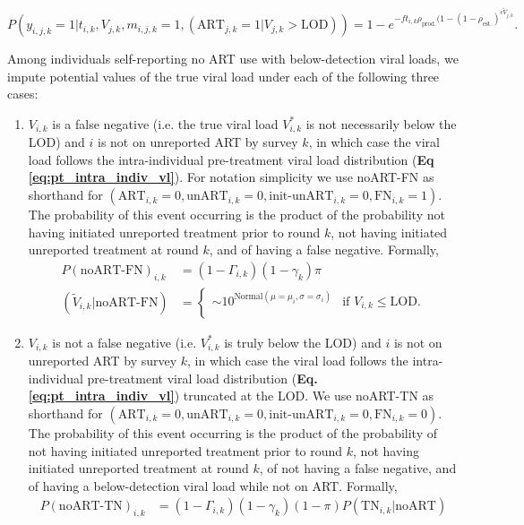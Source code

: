 \documentclass{article}[11pt]
\begin{document}
\begin{equation}
    P\left(y_{i,j,k}=1|t_{i,k},V_{j,k},m_{i,j,k}=1, (\text{ART}_{j,k}=1 |V_{j,k}>\text{LOD})\right) = 1 - e^{-ft_{i,k}\rho_\text{prod.}(1-(1-\rho_\text{est.})^{c\tilde{V}_{j,k}}}.
\end{equation}

Among individuals self-reporting no ART use with below-detection viral loads, we impute potential values of the true viral load under each of the following three cases: 
\begin{enumerate}
\item $V_{i,k}$ is a false negative (i.e. the true viral load $V^*_{i,k}$ is not necessarily below the LOD) and $i$ is not on unreported ART by survey $k$, in which case the viral load follows the intra-individual pre-treatment viral load distribution (\textbf{Eq \ref{eq:pt_intra_indiv_vl}}). For notation simplicity we use noART-FN as shorthand for $(\text{ART}_{i,k}=0,\text{unART}_{i,k}=0,\text{init-unART}_{i,k}=0,\text{FN}_{i,k}=1)$. The probability of this event occurring is the product of the probability not having initiated unreported treatment prior to round $k$, not having initiated unreported treatment at round $k$, and of having a false negative. Formally,
\begin{align}
P(\text{noART-FN})_{i,k} &= (1-\Gamma_{i,k})(1-\gamma_k)\pi \\
(\tilde{V}_{i,k}|\text{noART-FN}) &= \begin{cases} 
    \sim 10^{\text{Normal}(\mu=\mu_i, \sigma=\sigma_i)} & \text{if } V_{i,k} \leq \text{LOD}. \\
\end{cases}
\end{align}
\item $V_{i,k}$ is not a false negative (i.e. $V^*_{i,k}$ is truly below the LOD) and $i$ is not on unreported ART by survey $k$, in which case the viral load follows the intra-individual pre-treatment viral load distribution (\textbf{Eq. \ref{eq:pt_intra_indiv_vl}}) truncated at the LOD. We use noART-TN as shorthand for $(\text{ART}_{i,k}=0,\text{unART}_{i,k}=0,\text{init-unART}_{i,k}=0,\text{FN}_{i,k}=0)$. The probability of this event occurring is the product of the probability of not having initiated unreported treatment prior to round $k$, not having initiated unreported treatment at round $k$, of not having a false negative, and of having a below-detection viral load while not on ART. Formally,
\begin{align}
P(\text{noART-TN})_{i,k} &= (1-\Gamma_{i,k})(1-\gamma_k)(1-\pi)P(\text{TN}_{i,k}|\text{noART}) \\

\end{align}
\end{enumerate}
\end{document}
